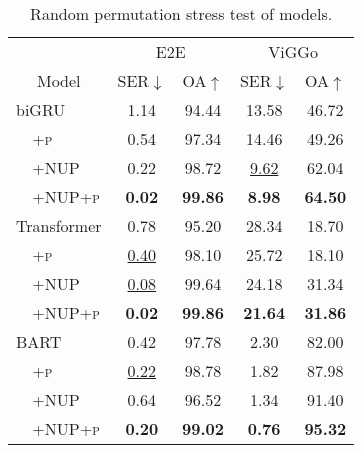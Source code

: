 \begin{table}

    \centering

    \begin{tabular}{llcccc}
\toprule
 & & \multicolumn{2}{c}{E2E} & \multicolumn{2}{c}{ViGGo} \\
\cmidrule(lr){3-4} \cmidrule(lr){5-6}
 \multicolumn{2}{c}{Model} & SER$\downarrow$ & OA$\uparrow$ & SER$\downarrow$ & OA$\uparrow$ \\
\midrule
\multicolumn{2}{l}{biGRU} &
 1.14 & 94.44 & 13.58 & 46.72 \\
 & \small{\textsc{+p }} &
 0.54 & 97.34 & 14.46 & 49.26 \\
 & \small{\textsc{+NUP }} &
 0.22 & 98.72 &  \uline{9.62} & 62.04 \\
 & \small{\textsc{+NUP+p }} &
\textbf{ 0.02} & \textbf{99.86} & \textbf{ 8.98} & \textbf{64.50} \\
\midrule
\multicolumn{2}{l}{Transformer} &
 0.78 & 95.20 & 28.34 & 18.70 \\
 & \small{\textsc{+p }} &
 \uline{0.40} & 98.10 & 25.72 & 18.10 \\
 & \small{\textsc{+NUP }} &
 \uline{0.08} & 99.64 & 24.18 & 31.34 \\
 & \small{\textsc{+NUP+p}} &
\textbf{ 0.02} & \textbf{99.86} & \textbf{21.64} & \textbf{31.86} \\
\midrule
\multicolumn{2}{l}{BART} &
 0.42 & 97.78 &  2.30 & 82.00 \\
 & \small{\textsc{+p }} &
\uline{0.22} & 98.78 &  1.82 & 87.98 \\
 & \small{\textsc{+NUP }} &
 0.64 & 96.52 &  1.34 & 91.40 \\
 & \small{\textsc{+NUP+p}} &
\textbf{ 0.20} & \textbf{99.02} & \textbf{ 0.76} & \textbf{95.32} \\
\bottomrule

    \end{tabular}

\caption{Random permutation stress test of  models.}
\label{tab:perm}
\end{table}
